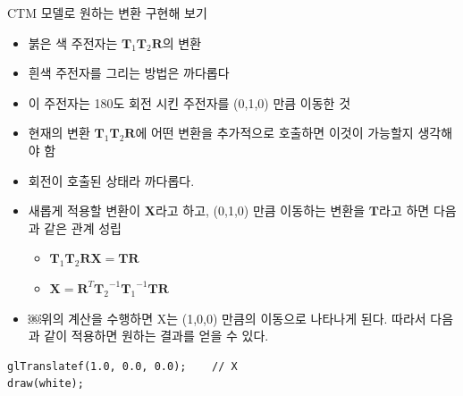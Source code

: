\documentclass{beamer}
\begin{document}
\begin{frame}[fragile]{CTM 모델로 원하는 변환 구현해 보기}

{\small

\begin{itemize}
\item 붉은 색 주전자는 ${\mathbf T}_1 {\mathbf T}_2  {\mathbf R}$의 변환
\item 흰색 주전자를 그리는 방법은 까다롭다
\item 이 주전자는 180도 회전 시킨 주전자를 (0,1,0) 만큼 이동한 것
\item 현재의 변환 ${\mathbf T}_1 {\mathbf T}_2  {\mathbf R}$에 어떤 변환을 추가적으로 호출하면 이것이 가능할지 생각해야 함
\item 회전이 호출된 상태라 까다롭다.
\item 새롭게 적용할 변환이 $\mathbf  X$라고 하고, (0,1,0) 만큼 이동하는 변환을 ${\mathbf T}$라고 하면 다음과 같은 관계 성립
	\begin{itemize}
	\item ${\mathbf T_1 \mathbf T_2 \mathbf R \mathbf X } = {\mathbf T \mathbf R} $
	\item $ {\mathbf X} = { \mathbf R^T {\mathbf T_2}^{-1} {\mathbf T_1}^{-1} \mathbf T \mathbf R}$
	\end{itemize}
\item ￼위의 계산을 수행하면 X는 (1,0,0) 만큼의 이동으로 나타나게 된다. 따라서 다음과 같이 적용하면 원하는 결과를 얻을 수 있다.
\end{itemize}

\begin{verbatim}
glTranslatef(1.0, 0.0, 0.0);	// X
draw(white);
\end{verbatim}

}
\end{frame}
\end{document}
